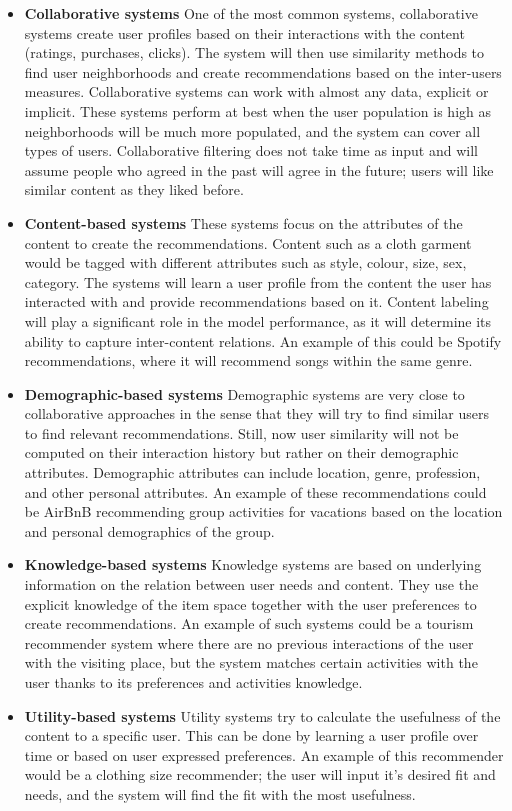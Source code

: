 \documentclass{kththesis}
\begin{document}
\begin{itemize}
    \item \textbf{Collaborative systems} One of the most common systems, collaborative systems create user profiles based on their interactions with the content (ratings, purchases, clicks). The system will then use similarity methods to find user neighborhoods and create recommendations based on the inter-users measures. Collaborative systems can work with almost any data, explicit or implicit. These systems perform at best when the user population is high as neighborhoods will be much more populated, and the system can cover all types of users. Collaborative filtering does not take time as input and will assume people who agreed in the past will agree in the future; users will like similar content as they liked before.
    
    \item \textbf{Content-based systems}  These systems focus on the attributes of the content to create the recommendations. Content such as a cloth garment would be tagged with different attributes such as style, colour, size, sex, category. The systems will learn a user profile from the content the user has interacted with and provide recommendations based on it. Content labeling will play a significant role in the model performance, as it will determine its ability to capture inter-content relations. An example of this could be Spotify recommendations, where it will recommend songs within the same genre. 
    \item \textbf{Demographic-based systems} Demographic systems are very close to collaborative approaches in the sense that they will try to find similar users to find relevant recommendations. Still, now user similarity will not be computed on their interaction history but rather on their demographic attributes. Demographic attributes can include location, genre, profession, and other personal attributes. An example of these recommendations could be AirBnB recommending group activities for vacations based on the location and personal demographics of the group.
    \item \textbf{Knowledge-based systems} Knowledge systems are based on underlying information on the relation between user needs and content. They use the explicit knowledge of the item space together with the user preferences to create recommendations. An example of such systems could be a tourism recommender system where there are no previous interactions of the user with the visiting place, but the system matches certain activities with the user thanks to its preferences and activities knowledge.
    
    \item \textbf{Utility-based systems} Utility systems try to calculate the usefulness of the content to a specific user. This can be done by learning a user profile over time or based on user expressed preferences. An example of this recommender would be a clothing size recommender; the user will input it's desired fit and needs, and the system will find the fit with the most usefulness.
    
\end{itemize}
\end{document}
